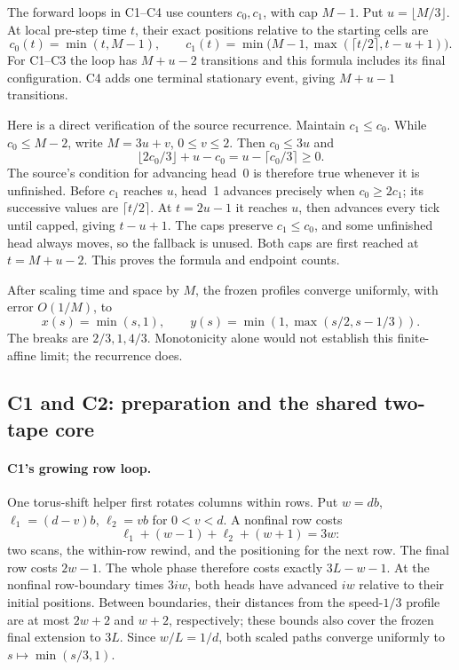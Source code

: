 The forward loops in C1--C4 use counters $c_0,c_1$, with cap $M-1$.
Put $u=\lfloor M/3\rfloor$. At local pre-step time $t$, their exact
positions relative to the starting cells are
\begin{equation}
\label{eq:variable}
 c_0(t)=\min(t,M-1),\qquad
 c_1(t)=\min\bigl(M-1,\max(\lceil t/2\rceil,t-u+1)\bigr).
\end{equation}
For C1--C3 the loop has $M+u-2$ transitions and this formula includes
its final configuration. C4 adds one terminal stationary event, giving
$M+u-1$ transitions.

Here is a direct verification of the source recurrence. Maintain
$c_1\le c_0$. While $c_0\le M-2$, write $M=3u+v$, $0\le v\le2$.
Then $c_0\le3u$ and
\[
 \lfloor2c_0/3\rfloor+u-c_0
   =u-\lceil c_0/3\rceil\ge0.
\]
The source's condition for advancing head~0 is therefore true whenever
it is unfinished. Before $c_1$ reaches $u$, head~1 advances precisely
when $c_0\ge2c_1$; its successive values are $\lceil t/2\rceil$.
At $t=2u-1$ it reaches $u$, then advances every tick until capped,
giving $t-u+1$. The caps preserve $c_1\le c_0$, and some unfinished
head always moves, so the fallback is unused. Both caps are first
reached at $t=M+u-2$. This proves the formula and endpoint counts.

After scaling time and space by $M$, the frozen profiles converge
uniformly, with error $O(1/M)$, to
\begin{equation}
\label{eq:variable-limit}
 x(s)=\min(s,1),\qquad y(s)=\min(1,\max(s/2,s-1/3)).
\end{equation}
The breaks are $2/3,1,4/3$. Monotonicity alone would not establish this
finite-affine limit; the recurrence does.

\subsection{C1 and C2: preparation and the shared two-tape core}

\paragraph{C1's growing row loop.}
One torus-shift helper first rotates columns within rows. Put $w=db$,
$\ell_1=(d-v)b$, $\ell_2=vb$ for $0<v<d$. A nonfinal row costs
\[
 \ell_1+(w-1)+\ell_2+(w+1)=3w:
\]
two scans, the within-row rewind, and the positioning for the next row.
The final row costs $2w-1$. The whole phase therefore costs exactly
$3L-w-1$. At the nonfinal row-boundary times $3iw$, both heads have
advanced $iw$ relative to their initial positions. Between boundaries,
their distances from the speed-$1/3$ profile are at most $2w+2$ and
$w+2$, respectively; these bounds also cover the frozen final extension
to $3L$. Since $w/L=1/d$, both scaled paths converge uniformly to
$s\mapsto\min(s/3,1)$.

